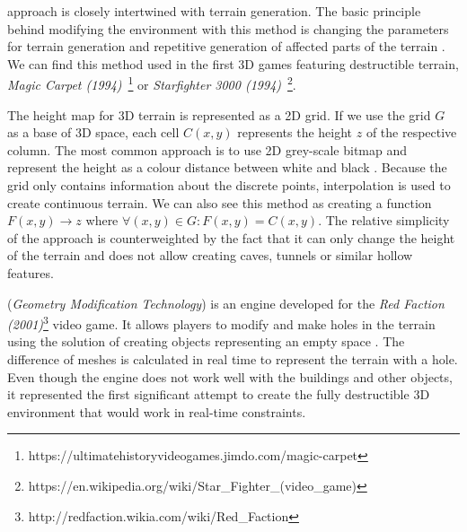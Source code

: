  approach is closely intertwined with terrain generation. The basic principle behind modifying the environment with this method is changing the parameters for terrain generation and repetitive generation of affected parts of the terrain . We can find this method used in the first 3D games featuring destructible terrain, \eg \emph{Magic Carpet (1994)}~\footnote{https://ultimatehistoryvideogames.jimdo.com/magic-carpet} or \emph{Starfighter 3000 (1994)}~\footnote{https://en.wikipedia.org/wiki/Star\_Fighter\_(video\_game)}.

The height map for 3D terrain is represented as a 2D grid. If we use the grid $G$  as a base of 3D space, each cell $C(x,y)$ represents the height $z$ of the respective column. The most common approach  is to use 2D grey-scale bitmap and represent the height as a colour distance between white and black . Because the grid only contains information about the discrete points, interpolation is used to create continuous terrain. We can also see this method as creating a function $F(x,y) \rightarrow z$ where $\forall (x,y) \in G : F(x,y) = C(x,y)$. The relative simplicity of the approach is counterweighted  by the fact that it can only change the height of the terrain and does not allow creating caves, tunnels or similar hollow features.

 (\emph{Geometry Modification Technology}\cite{geomod}) is an engine developed for the \emph{Red Faction (2001)}\footnote{http://redfaction.wikia.com/wiki/Red\_Faction} video game. It allows players to modify and make holes  in the terrain using the solution of creating objects representing an empty space . The difference of meshes is calculated in real time to represent the terrain with a  hole. Even though the engine does not work well with the buildings and other objects, it represented the first significant attempt to create the fully destructible 3D environment that would work in real-time constraints.

